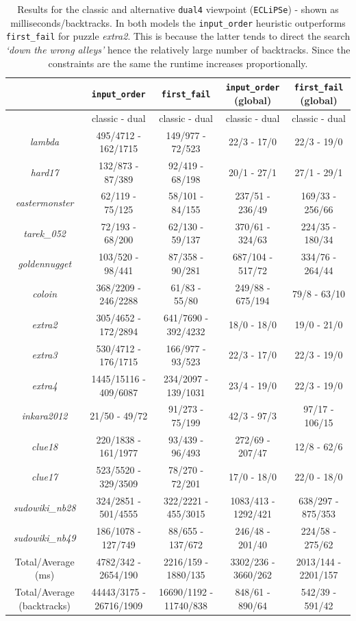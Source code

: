 \begin{table}[H]
\footnotesize
\bgroup
\def\arraystretch{1.3}
\begin{tabular}{ccc|cc}
\multicolumn{1}{l}{}    & \texttt{input\_order} & \texttt{first\_fail} & \texttt{input\_order} (global) & \texttt{first\_fail} (global) \\ \hline
& classic - dual & classic - dual & classic - dual & classic - dual \\
\textit{lambda} & 495/4712 - 162/1715 &  149/977 - 72/523 &  22/3 - 17/0 & 22/3 - 19/0 \\
\textit{hard17} & 132/873 - 87/389 & 92/419  - 68/198 &  20/1 - 27/1 & 27/1 - 29/1 \\
\textit{eastermonster}  & 62/119 - 75/125 & 58/101 - 84/155 &  237/51 - 236/49 & 169/33 - 256/66  \\
\textit{tarek\_052}  & 72/193 - 68/200 & 62/130 - 59/137 &  370/61 - 324/63 & 224/35 - 180/34  \\
\textit{goldennugget} & 103/520 - 98/441 & 87/358 - 90/281 &  687/104 - 517/72 & 334/76 - 264/44  \\
\textit{coloin} & 368/2209 - 246/2288 & 61/83 - 55/80 &  249/88 - 675/194 & 79/8 - 63/10  \\
\textit{extra2} & 305/4652 - 172/2894 & 641/7690 - 392/4232 &  18/0 - 18/0 & 19/0 - 21/0  \\
\textit{extra3} & 530/4712 - 176/1715 & 166/977 - 93/523 &  22/3 - 17/0 & 22/3 - 19/0   \\
\textit{extra4} & 1445/15116 - 409/6087 & 234/2097 - 139/1031 &  23/4 - 19/0 & 22/3 - 19/0  \\
\textit{inkara2012} & 21/50 - 49/72 & 91/273 - 75/199 &  42/3 - 97/3 & 97/17 - 106/15  \\
\textit{clue18} & 220/1838 - 161/1977 & 93/439 - 96/493 &  272/69 - 207/47 & 12/8 - 62/6  \\
\textit{clue17} & 523/5520 - 329/3509 & 78/270 - 72/201 &  17/0 - 18/0 & 22/0 - 18/0  \\
\textit{sudowiki\_nb28} & 324/2851 - 501/4555 & 322/2221 - 455/3015 & 1083/413 - 1292/421 & 638/297 - 875/353  \\
\textit{sudowiki\_nb49} & 186/1078 - 127/749 & 88/655 - 137/672 & 246/48 - 201/40 & 224/58 - 275/62  \\\hline
Total/Average (ms) & 4782/342 - 2654/190 & 2216/159 - 1880/135 & 3302/236 - 3660/262 & 2013/144 - 2201/157   \\
Total/Average (backtracks) & 44443/3175 - 26716/1909 & 16690/1192 - 11740/838 & 848/61 - 890/64 & 542/39 - 591/42                          
\end{tabular}
\egroup
\caption{Results for the classic and alternative \texttt{dual4} viewpoint (\texttt{ECLiPSe}) - shown as milliseconds/backtracks. In both models the \texttt{input\_order} heuristic outperforms \texttt{first\_fail} for puzzle \textit{extra2}. This is because the latter tends to direct the search \textit{`down the wrong alleys'} hence the relatively large number of backtracks. Since the constraints are the same the runtime increases proportionally.}
\label{tab:res2}
\end{table}

